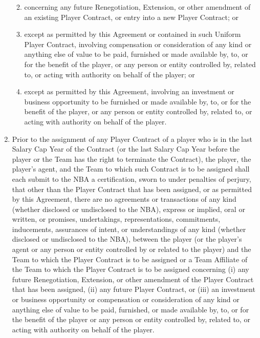\documentclass[
]{book}
\providecommand{\tightlist}{%
  \setlength{\itemsep}{0pt}\setlength{\parskip}{0pt}}
\begin{document}
\begin{enumerate}
  \begin{enumerate}
  \def\labelenumii{(\roman{enumii})}
  \tightlist
  \item
    concerning any future Renegotiation, Extension, or other amendment of an existing Player Contract, or entry into a new Player Contract; or
  \item
    except as permitted by this Agreement or contained in such Uniform Player Contract, involving compensation or consideration of any kind or anything else of value to be paid, furnished or made available by, to, or for the benefit of the player, or any person or entity controlled by, related to, or acting with authority on behalf of the player; or
  \item
    except as permitted by this Agreement, involving an investment or business opportunity to be furnished or made available by, to, or for the benefit of the player, or any person or entity controlled by, related to, or acting with authority on behalf of the player.
  \end{enumerate}
\item
  Prior to the assignment of any Player Contract of a player who is in the last Salary Cap Year of the Contract (or the last Salary Cap Year before the player or the Team has the right to terminate the Contract), the player, the player's agent, and the Team to which such Contract is to be assigned shall each submit to the NBA a certification, sworn to under penalties of perjury, that other than the Player Contract that has been assigned, or as permitted by this Agreement, there are no agreements or transactions of any kind (whether disclosed or undisclosed to the NBA), express or implied, oral or written, or promises, undertakings, representations, commitments, inducements, assurances of intent, or understandings of any kind (whether disclosed or undisclosed to the NBA), between the player (or the player's agent or any person or entity controlled by or related to the player) and the Team to which the Player Contract is to be assigned or a Team Affiliate of the Team to which the Player Contract is to be assigned concerning (i) any future Renegotiation, Extension, or other amendment of the Player Contract that has been assigned, (ii) any future Player Contract, or (iii) an investment or business opportunity or compensation or consideration of any kind or anything else of value to be paid, furnished, or made available by, to, or for the benefit of the player or any person or entity controlled by, related to, or acting with authority on behalf of the player.

\end{enumerate}
\end{document}
